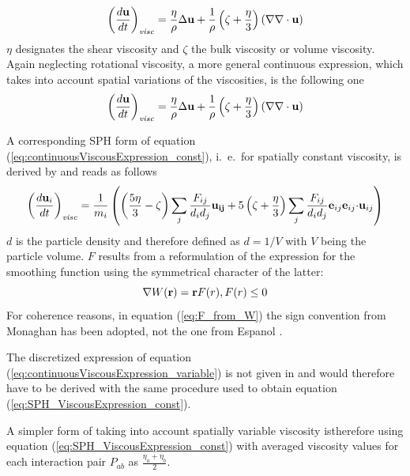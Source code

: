 \documentclass{report}
\begin{document}
\begin{equation}
\label{eq:continuousViscousExpression_const}
\left(\frac{d{\bf u}}{dt}\right)_{\mathit{visc}}=\frac{\eta}{\rho}\Delta {\bf u}+\frac{1}{\rho}\left(\zeta +\frac{\eta}{3}\right)\left(\nabla \nabla \cdot {\bf u}\right)
\end{equation}
$\eta$ designates the shear viscosity and $\zeta$ the bulk viscosity or volume viscosity.
Again neglecting rotational viscosity, a more general continuous expression, which takes into account spatial variations of the viscosities, is the following one
\begin{equation}
\label{eq:continuousViscousExpression_variable}
\left(\frac{d{\bf u}}{dt}\right)_{\mathit{visc}}=\frac{\eta}{\rho}\Delta {\bf u}+\frac{1}{\rho}\left(\zeta +\frac{\eta}{3}\right)\left(\nabla \nabla \cdot {\bf u}\right)
\end{equation}


A corresponding SPH form of equation (\ref{eq:continuousViscousExpression_const}), i.\ e.\ for spatially constant viscosity, is derived by \cite{Espanol2003} and reads as follows
\begin{equation}
\label{eq:SPH_ViscousExpression_const}
\left(\frac{d{\bf u}_i}{dt}\right)_{\mathit{visc}}=\frac{1}{m_i}\left( \left(\frac{5\eta}{3}-\zeta\right)\sum_j\frac{F_{ij}}{d_i d_j}{\bf u_{ij}}+5\left(\zeta+\frac{\eta}{3}\right) \sum_j\frac{F_{ij}}{d_i d_j}{\bf e}_{ij} {\bf e}_{ij}{\bf \cdot u}_{ij}\right)
\end{equation}
$d$ is the particle density and therefore defined as $d=1/V$ with $V$ being the particle volume. $F$ results from a reformulation of the expression for the smoothing function using the symmetrical character of the latter:
\begin{equation}
 \label{eq:F_from_W}
\nabla W({\bf r})={\bf r} F(r), F(r)\leq 0
\end{equation}
For coherence reasons, in equation (\ref{eq:F_from_W}) the sign convention from Monaghan \cite{Monaghan2005} has been adopted, not the one from Espanol \cite{Espanol2003}.

The discretized expression of equation (\ref{eq:continuousViscousExpression_variable}) is not given in \cite{Espanol2003} and would therefore have to be derived with the same procedure used to obtain equation (\ref{eq:SPH_ViscousExpression_const}). 

A simpler form of taking into account spatially variable viscosity istherefore  using equation (\ref{eq:SPH_ViscousExpression_const}) with averaged viscosity values for each interaction pair $P_{ab}$ as $\frac{\eta_a+\eta_b}{2}$.
\end{document}
